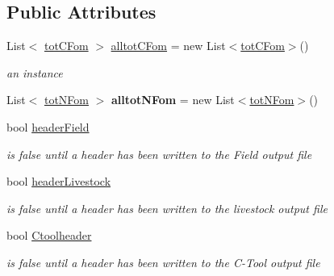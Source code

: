 \subsection*{Public Attributes}
\begin{DoxyCompactItemize}
\item 
\mbox{\label{class_global_vars_a8053b09fd5b316711e87abb39ef0e07c}} 
List$<$ \mbox{\hyperlink{struct_global_vars_1_1tot_c_fom}{tot\+C\+Fom}} $>$ \mbox{\hyperlink{class_global_vars_a8053b09fd5b316711e87abb39ef0e07c}{alltot\+C\+Fom}} = new List$<$\mbox{\hyperlink{struct_global_vars_1_1tot_c_fom}{tot\+C\+Fom}}$>$()
\begin{DoxyCompactList}\small\item\em an instance \end{DoxyCompactList}\item 
\mbox{\label{class_global_vars_a2572f02893208587743e907ff7662914}} 
List$<$ \mbox{\hyperlink{struct_global_vars_1_1tot_n_fom}{tot\+N\+Fom}} $>$ {\bfseries alltot\+N\+Fom} = new List$<$\mbox{\hyperlink{struct_global_vars_1_1tot_n_fom}{tot\+N\+Fom}}$>$()
\item 
\mbox{\label{class_global_vars_a2e743041f1f7c995cc92ce90dced2822}} 
bool \mbox{\hyperlink{class_global_vars_a2e743041f1f7c995cc92ce90dced2822}{header\+Field}}
\begin{DoxyCompactList}\small\item\em is false until a header has been written to the Field output file \end{DoxyCompactList}\item 
\mbox{\label{class_global_vars_a13f0621b9ef546909f40ca12eb999c78}} 
bool \mbox{\hyperlink{class_global_vars_a13f0621b9ef546909f40ca12eb999c78}{header\+Livestock}}
\begin{DoxyCompactList}\small\item\em is false until a header has been written to the livestock output file \end{DoxyCompactList}\item 
\mbox{\label{class_global_vars_a0b8860093c80385ce3a6d8c590f3023c}} 
bool \mbox{\hyperlink{class_global_vars_a0b8860093c80385ce3a6d8c590f3023c}{Ctoolheader}}
\begin{DoxyCompactList}\small\item\em is false until a header has been written to the C-\/\+Tool output file \end{DoxyCompactList}\item 

\end{DoxyCompactItemize}
